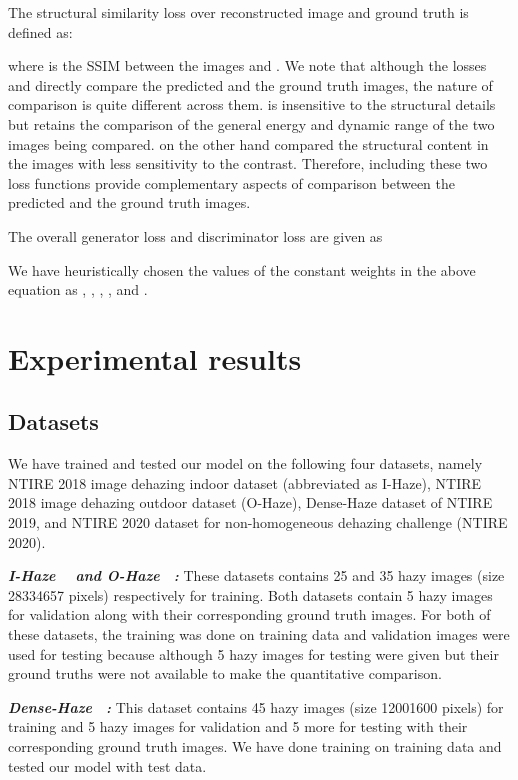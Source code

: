 \documentclass[runningheads]{llncs}
\begin{document}
The structural similarity loss  over reconstructed image  and ground truth  is defined as:



\noindent where  is the SSIM \cite{wang2004image} between the images  and . We note that although the losses  and  directly compare the predicted and the ground truth images, the nature of comparison is quite different across them.  is insensitive to the structural details but retains the comparison of the general energy and dynamic range of the two images being compared.  on the other hand compared the structural content in the images with less sensitivity to the contrast. Therefore, including these two loss functions provide complementary aspects of comparison between the predicted and the ground truth images.   

The overall generator loss  and discriminator loss  are given as 




We have heuristically chosen the values of the constant weights in the above equation as , , , , and .


\section{Experimental results}\label{sec:results}

\subsection{Datasets}
We have trained and tested our model on the following four datasets, namely NTIRE 2018 image dehazing indoor dataset (abbreviated as I-Haze), NTIRE 2018 image dehazing outdoor dataset (O-Haze), Dense-Haze dataset of NTIRE 2019, and NTIRE 2020 dataset for non-homogeneous dehazing challenge (NTIRE 2020).

\textbf{\textit{I-Haze ~\cite{DBLP:journals/corr/abs-1804-05091} and O-Haze ~\cite{ancuti2018haze}:}} These datasets contains 25 and 35 hazy images (size 28334657 pixels) respectively for training. Both datasets contain 5 hazy images for validation along with their corresponding ground truth images. For both of these datasets, the training was done on training data and validation images were used for testing because although 5 hazy images for testing were given but their ground truths were not available to make the quantitative comparison. 

\textbf{\textit{Dense-Haze ~\cite{ancuti2019dense}:}} This dataset contains 45 hazy images (size 12001600 pixels) for training and 5 hazy images for validation and 5 more for testing with their corresponding ground truth images. We have done training on training data and tested our model with test data.
\end{document}
